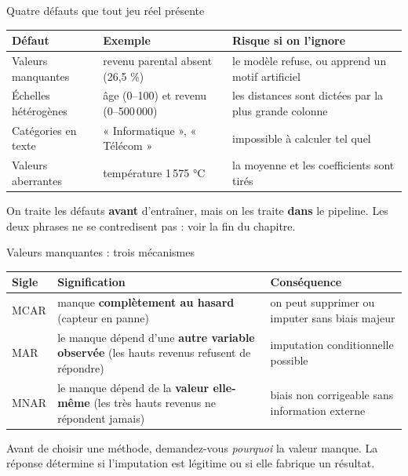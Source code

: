 \begin{frame}{Quatre défauts que tout jeu réel présente}
\begin{center}
\small
\begin{tabular}{@{}p{}p{}p{}@{}}
\toprule
\textbf{Défaut} & \textbf{Exemple} & \textbf{Risque si on l'ignore} \\
\midrule
Valeurs manquantes & revenu parental absent (26,5 \%) & le modèle refuse, ou
apprend un motif artificiel \\
Échelles hétérogènes & âge (0--100) et revenu (0--500\,000) & les distances
sont dictées par la plus grande colonne \\
Catégories en texte & « Informatique », « Télécom » & impossible à calculer
tel quel \\
Valeurs aberrantes & température 1\,575 °C & la moyenne et les coefficients
sont tirés \\
\bottomrule
\end{tabular}
\end{center}
\vspace{1.5mm}
\begin{kbox}
On traite les défauts \textbf{avant} d'entraîner, mais on les traite
\textbf{dans} le pipeline. Les deux phrases ne se contredisent pas : voir la
fin du chapitre.
\end{kbox}
\end{frame}

\begin{frame}{Valeurs manquantes : trois mécanismes}
\begin{center}
\small
\begin{tabular}{@{}p{}p{}p{}@{}}
\toprule
\textbf{Sigle} & \textbf{Signification} & \textbf{Conséquence} \\
\midrule
MCAR & manque \textbf{complètement au hasard} (capteur en panne) & on peut
supprimer ou imputer sans biais majeur \\
MAR & le manque dépend d'une \textbf{autre variable observée} (les hauts
revenus refusent de répondre) & imputation conditionnelle possible \\
MNAR & le manque dépend de la \textbf{valeur elle-même} (les très hauts
revenus ne répondent jamais) & biais non corrigeable sans information
externe \\
\bottomrule
\end{tabular}
\end{center}
\vspace{1.5mm}
\begin{wbox}[À retenir]
Avant de choisir une méthode, demandez-vous \emph{pourquoi} la valeur manque.
La réponse détermine si l'imputation est légitime ou si elle fabrique un
résultat.
\end{wbox}
\end{frame}

